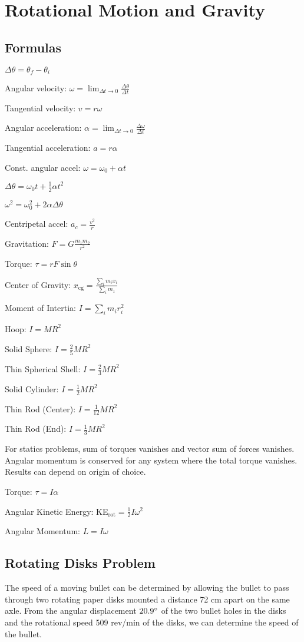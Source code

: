 \documentclass[../physics12.tex]{subfiles}
\begin{document}
\chapter{Rotational Motion and Gravity}
\section{Formulas}
$\Delta \theta = \theta_f - \theta_i$

Angular velocity: $\omega = \lim_{\Delta t \to 0}\frac{\Delta \theta}{\Delta t}$

Tangential velocity: $v=r\omega$

Angular acceleration: $\alpha = \lim_{\Delta t \to 0}\frac{\Delta \omega}{\Delta t}$

Tangential acceleration: $a=r\alpha$

Const. angular accel: $\omega = \omega_0 + \alpha t$

$\Delta \theta = \omega_0 t + \frac{1}{2}\alpha t^2$

$\omega^2 = \omega_0^2 + 2\alpha\Delta\theta$

Centripetal accel: $a_c = \frac{v^2}{r}$

Gravitation: $F=G\frac{m_1m_2}{r^2}$

Torque: $\tau = rF\sin\theta$

Center of Gravity: $x_{\text{cg}} = \frac{\sum_i m_ix_i}{\sum_i m_1}$

Moment of Intertia: $I=\sum_i m_ir_i^2$

Hoop: $I=MR^2$

Solid Sphere: $I=\frac{2}{5}MR^2$

Thin Spherical Shell: $I=\frac{2}{3}MR^2$

Solid Cylinder: $I=\frac{1}{2}MR^2$

Thin Rod (Center): $I=\frac{1}{12}MR^2$

Thin Rod (End): $I=\frac{1}{3}MR^2$

For statics problems, sum of torques vanishes and vector sum of forces vanishes. Angular momentum is conserved for any system where the total torque vanishes. 
Results can depend on origin of choice.

Torque: $\tau = I\alpha$

Angular Kinetic Energy: KE$_{\text{rot}} = \frac{1}{2}I\omega^2$

Angular Momentum: $L=I\omega$
\section{Rotating Disks Problem}
The speed of a moving bullet can be determined by allowing the bullet to pass through two rotating paper disks mounted a distance 72 cm 
apart on the same axle. From the angular displacement $20.9\degree$ of the two bullet holes in the disks and the rotational speed 
509 rev/min of the disks, we can determine the speed of the bullet.
\end{document}
